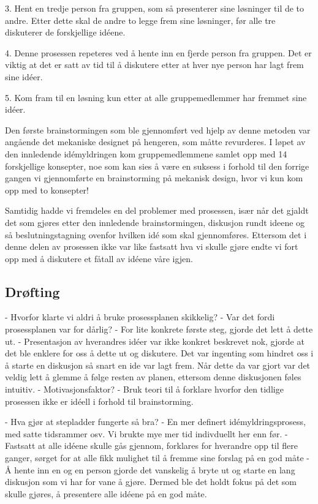 3. Hent en tredje person fra gruppen, som så presenterer sine løsninger til de to andre. Etter dette skal de andre to legge frem sine løsninger, før alle tre diskuterer de forskjellige idéene. \newline

4. Denne prosessen repeteres ved å hente inn en fjerde person fra gruppen. Det er viktig at det er satt av tid til å diskutere etter at hver nye person har lagt frem sine idéer.\newline

5. Kom fram til en løsning kun etter at alle gruppemedlemmer har fremmet sine idéer.\newline

Den første brainstormingen som ble gjennomført ved hjelp av denne metoden var angående det mekaniske designet på hengeren, som måtte revurderes. I løpet av den innledende idémyldringen kom gruppemedlemmene samlet opp med 14 forskjellige konsepter, noe som kan sies å være en suksess i forhold til den forrige gangen vi gjennomførte en brainstorming på mekanisk design, hvor vi kun kom opp med to konsepter!\newline

Samtidig hadde vi fremdeles en del problemer med prosessen, især når det gjaldt det som gjøres etter den innledende brainstormingen, diskusjon rundt ideene og så beslutningstagning ovenfor hvilken idé som skal gjennomføres. Ettersom det i denne delen av prosessen ikke var like fastsatt hva vi skulle gjøre endte vi fort opp med å diskutere et fåtall av idéene våre igjen.\newline

\subsection{Drøfting}
- Hvorfor klarte vi aldri å bruke prosessplanen skikkelig?
- Var det fordi prosessplanen var for dårlig?
- For lite konkrete første steg, gjorde det lett å dette ut.
- Presentasjon av hverandres idéer var ikke konkret beskrevet nok, gjorde at det ble enklere for    oss å dette ut og diskutere. Det var ingenting som hindret oss i å starte en diskusjon så snart en ide var lagt frem. Når dette da var gjort var det veldig lett å glemme å følge resten av planen, ettersom denne diskusjonen føles intuitiv.
- Motivasjonsfaktor?
- Bruk teori til å forklare hvorfor den tidlige prosessen ikke er idéell i forhold til brainstorming.\newline

- Hva gjør at stepladder fungerte så bra?
- En mer definert idémyldringsprosess, med satte tidsrammer osv. Vi brukte mye mer tid indivduellt her enn før. 
- Fastsatt at alle idéene skulle gås gjennom, forklares for hverandre opp til flere ganger, sørget for at alle fikk mulighet til å fremme sine forslag på en god måte
- Å hente inn en og en person gjorde det vanskelig å bryte ut og starte en lang diskusjon som vi har for vane å gjøre. Dermed ble det holdt fokus på det som skulle gjøres, å presentere alle idéene på en god måte.

